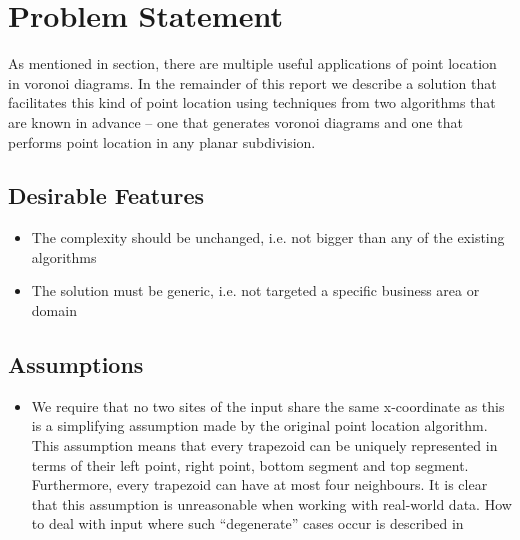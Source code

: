 \section{Problem Statement}
As mentioned in section, there are multiple useful applications of point location in voronoi diagrams. In the remainder of this report we describe a solution that facilitates this kind of point location using techniques from two algorithms that are known in advance – one that generates voronoi diagrams and one that performs point location in any planar subdivision. 

\subsection{Desirable Features}
\label{problem_analysis}

\begin{itemize}
  \item The complexity should be unchanged, i.e. not bigger than any of the existing algorithms
  \item The solution must be generic, i.e. not targeted a specific business area or domain
\end{itemize}

\subsection{Assumptions}
\label{assumptions}

\begin{itemize}
  \item We require that no two sites of the input share the same x-coordinate as this is a simplifying assumption made by the original point location algorithm. This assumption means that every trapezoid can be uniquely represented in terms of their left point, right point, bottom segment and top segment. Furthermore, every trapezoid can have at most four neighbours. It is clear that this assumption is unreasonable when working with real-world data. How to deal with input where such “degenerate” cases occur is described in \cite{computational_geometry}
\end{itemize}





